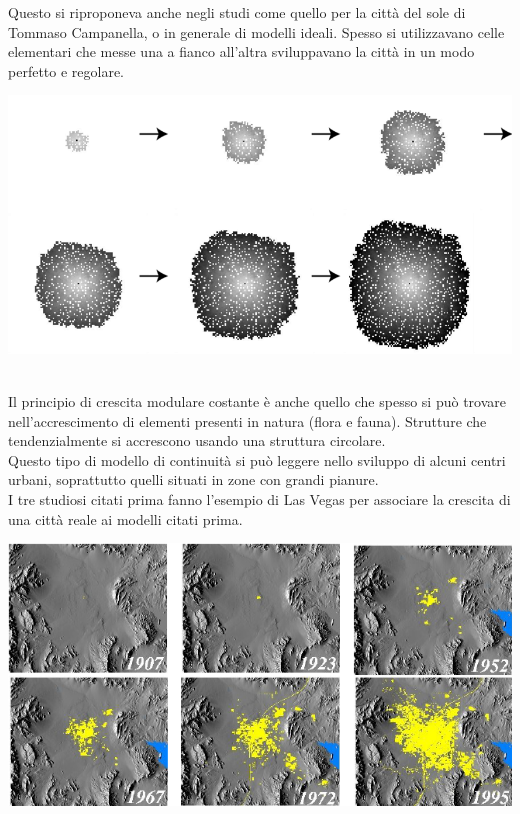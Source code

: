 \documentclass[a4paper,12pt, oneside]{book}
\begin{document}
  Questo si riproponeva anche negli studi come quello per la città del sole di Tommaso Campanella, o in generale di modelli ideali. Spesso si utilizzavano celle elementari che messe una a fianco all'altra sviluppavano la città in un modo perfetto e regolare.\\
  \begin{center}
  	\includegraphics[width=0.6\linewidth]{"immagini/modello urbano a sviluppo circolare"}
  	\label{fig:modello urbano a sviluppo circolare}
  \end{center}
  \leavevmode\\
  Il principio di crescita modulare costante è anche quello che spesso si può trovare nell'accrescimento di elementi presenti in natura (flora e fauna). Strutture che tendenzialmente si accrescono usando una struttura circolare.\\
  Questo tipo di modello di continuità si può leggere nello sviluppo di alcuni centri urbani, soprattutto quelli situati in zone con grandi pianure.\\
  I tre studiosi citati prima fanno l'esempio di Las Vegas per associare la crescita di una città reale ai modelli citati prima.\\
  \begin{center}
  	\includegraphics[width=0.8\linewidth]{"immagini/The-Growth-of-Las-Vegas-from-1907-to-1995-from-Acevedo-et-al-1997"}
  	\label{fig:The-Growth-of-Las-Vegas-from-1907-to-1995-from-Acevedo-et-al-1997}
  \end{center}
\end{document}
